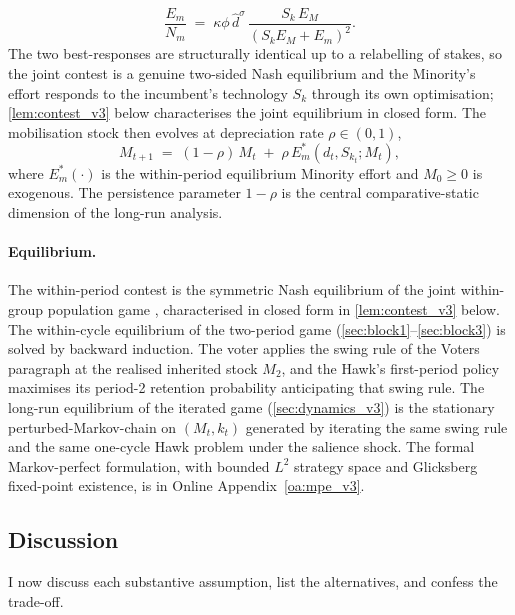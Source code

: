 \documentclass[11pt,twoside]{extarticle}
\begin{document}
\begin{equation}\label{eq:Em_BR_v3}
    \frac{E_m}{N_m}\;=\;\kappa\phi\,\hat d^\sigma\,\frac{S_k\,E_M}{(S_k E_M+E_m)^2}.
\end{equation}
The two best-responses are structurally identical up to a relabelling of stakes, so the joint contest is a genuine two-sided Nash equilibrium and the Minority's effort responds to the incumbent's technology $S_k$ through its own optimisation; \autoref{lem:contest_v3} below characterises the joint equilibrium in closed form. The mobilisation stock then evolves at depreciation rate $\rho\in(0,1)$,
\begin{equation}\label{eq:M_evolution_v3}
    M_{t+1}\;=\;(1-\rho)\,M_t\;+\;\rho\,E_m^*(d_t,S_{k_t};M_t),
\end{equation}
where $E_m^*(\cdot)$ is the within-period equilibrium Minority effort and $M_0\ge 0$ is exogenous. The persistence parameter $1-\rho$ is the central comparative-static dimension of the long-run analysis.

\paragraph{Equilibrium.} The within-period contest is the symmetric Nash equilibrium of the joint within-group population game \citet*{sandholmPopulationGamesEvolutionary2010}, characterised in closed form in \autoref{lem:contest_v3} below. The within-cycle equilibrium of the two-period game (\autoref{sec:block1}--\autoref{sec:block3}) is solved by backward induction. The voter applies the swing rule of the Voters paragraph at the realised inherited stock $M_2$, and the Hawk's first-period policy maximises its period-2 retention probability anticipating that swing rule. The long-run equilibrium of the iterated game (\autoref{sec:dynamics_v3}) is the stationary perturbed-Markov-chain on $(M_t,k_t)$ generated by iterating the same swing rule and the same one-cycle Hawk problem under the salience shock. The formal Markov-perfect formulation, with bounded $L^2$ strategy space and Glicksberg fixed-point existence, is in Online Appendix~\ref{oa:mpe_v3}.

\subsection{ Discussion}\label{subsec:discussion_v3} 
I now discuss each substantive assumption, list the alternatives, and confess the trade-off.
\end{document}
